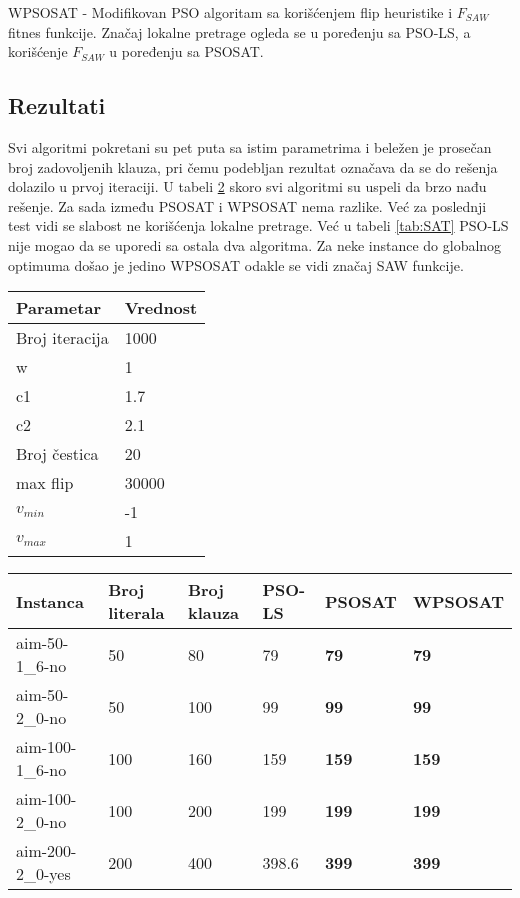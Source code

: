\documentclass{article}
\begin{document}
WPSOSAT - Modifikovan PSO algoritam sa korišćenjem flip heuristike i $F_{SAW}$ fitnes funkcije. Značaj lokalne pretrage ogleda se u poređenju sa PSO-LS, a korišćenje $F_{SAW}$ u poređenju sa PSOSAT.\\

\subsection{Rezultati}
Svi algoritmi pokretani su pet puta sa istim parametrima i beležen je prosečan broj zadovoljenih klauza, pri čemu podebljan rezultat označava da se do rešenja dolazilo u prvoj iteraciji. U tabeli \ref{tab:UNSAT} skoro svi algoritmi su uspeli da brzo nađu rešenje. Za sada između PSOSAT i WPSOSAT nema razlike. Već za poslednji test vidi se slabost ne korišćenja lokalne pretrage. Već u tabeli \ref{tab:SAT} PSO-LS nije mogao da se uporedi sa ostala dva algoritma. Za neke instance do globalnog optimuma došao je jedino WPSOSAT odakle se vidi značaj SAW funkcije.

\begin{table}[h!]
\centering
{}\label{tab:parametri} 
\begin{tabular}{ |p{3cm}|p{2cm}| }
 \hline
 Parametar 	& Vrednost\\
 \hline
 Broj iteracija & 1000 \\
 \hline
 w 				& 1\\
 \hline
 c1 			& 1.7\\
 \hline
 c2				& 2.1\\ 
 \hline
 Broj čestica	& 20\\
 \hline
 max flip & 30000 \\
 \hline
 $v_{min}$ 		& -1\\
 \hline
 $v_{max}$		& 1\\ 
 \hline
\end{tabular}
\end{table}


\begin{table}[h!]
\centering
{}\label{tab:UNSAT}
\begin{tabular}{ |p{3cm}|p{2cm}|p{2cm}||p{2cm}|p{2cm}|p{2cm}| }
 \hline
 Instanca & Broj literala & Broj klauza & PSO-LS & PSOSAT & WPSOSAT\\
 \hline
 aim-50-1\_6-no & 50 & 80 & 79 & \textbf{79} & \textbf{79}\\
 \hline
 aim-50-2\_0-no & 50 & 100 & 99 & \textbf{99} & \textbf{99}\\
 \hline
 aim-100-1\_6-no & 100 & 160 & 159 & \textbf{159} & \textbf{159}\\
 \hline
 aim-100-2\_0-no & 100 & 200 & 199 & \textbf{199} & \textbf{199}\\
 \hline
 aim-200-2\_0-yes & 200 & 400 & 398.6 & \textbf{399} & \textbf{399}\\
 \hline
\end{tabular}
\end{table}
\end{document}
